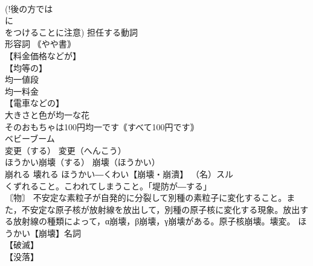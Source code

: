 \documentclass[8pt]{extreport}
\begin{document}
\begin{CJK}{UTF8}{min}
\\	(!後の方では 
\\	に 
\\	をつけることに注意) 担任する動詞 
\\	[(している) 
\\	彼が担任している生徒 
\\	平均的（な）		平均的　（へいきんてき） 
\\	平均的なアメリカ人男性 
\\	平均的な家庭の暮らしは、昔とはずいぶん変わっている。 
\\	（家庭　かてい） 平均的な成人は1週間に＿時間ぐらいテレビを見ている。
\\	（成人　せいじん） 
\\	均: ならす【均す】 〖平らにする〗
\\	〖平均する〗
\\	地面をローラーでならす 
\\	きんとう【均等】 
\\	（⇨平等） 
\\	教育の機会均等 
\\	と複数形も可) きんぶん【均分】名詞 
\\	均分する動詞 
\\	均分相続 
\\	きんいつ【均一】名詞 
\\	均一の[な]形容詞 ｟やや書｠
\\	【料金価格などが】
\\	【均等の】
\\	均一値段 
\\	均一料金 
\\	【電車などの】
\\	大きさと色が均一な花 
\\	そのおもちゃは100円均一です｟すべて100円です｠ 
\\	ベビーブーム		
\\	変更（する）		変更（へんこう） 
\\	ほうかい崩壊（する）		崩壊（ほうかい） 
\\	崩れる 壊れる ほうかい―くわい【崩壊・崩潰】 （名）スル 
\\	くずれること。こわれてしまうこと。「堤防が―する」 
\\	〘物〙 不安定な素粒子が自発的に分裂して別種の素粒子に変化すること。また，不安定な原子核が放射線を放出して，別種の原子核に変化する現象。放出する放射線の種類によって，α崩壊，β崩壊，γ崩壊がある。原子核崩壊。壊変。 ほうかい【崩壊】名詞 
\\	【破滅】
\\	【没落】

\end{CJK}
\end{document}

